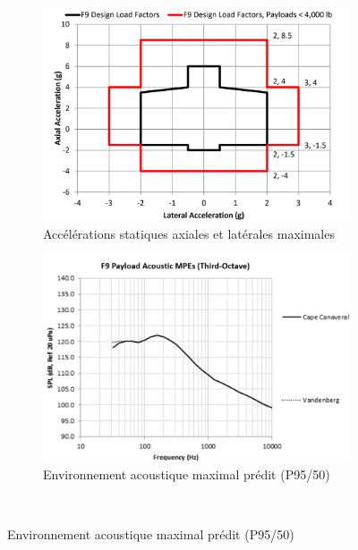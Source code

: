 \begin{figure}[h] %
     \centering
     \begin{subfigure}[]{0.48\textwidth}
         \centering
         \includegraphics[width=\textwidth]{Img/falcon_static.png}
         \caption{Accélérations statiques axiales et latérales maximales}
         \label{fig:falcon9_static}
     \end{subfigure}
     \hfill
     \begin{subfigure}[]{0.48\textwidth}
         \centering
         \includegraphics[width=\textwidth]{Img/falcon_acoustic.png}
         \caption{Environnement acoustique maximal prédit (P95/50)}
         \label{fig:falcon9_acoustic}
     \end{subfigure}
     \\

\end{figure}
